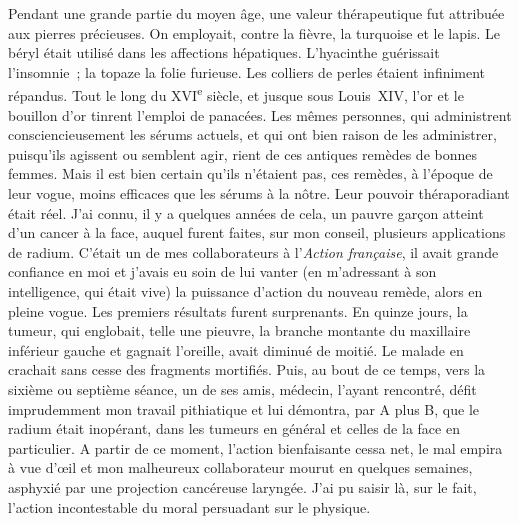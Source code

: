 \documentclass[french,twoside]{book} %
\begin{document}
Pendant une grande partie du moyen âge, une valeur thérapeutique fut attribuée aux pierres précieuses. On employait, contre la fièvre, la turquoise et le lapis. Le béryl était utilisé dans les affections hépatiques. L’hyacinthe guérissait l’insomnie ; la topaze la folie furieuse. Les colliers de perles étaient infiniment répandus. Tout le long du XVI\textsuperscript{e} siècle, et jusque sous Louis XIV, l’or et le bouillon d’or tinrent l’emploi de panacées. Les mêmes personnes, qui administrent consciencieusement les sérums actuels, et qui ont bien raison de les administrer, puisqu’ils agissent ou semblent agir, rient de ces antiques remèdes de bonnes femmes. Mais il est bien certain qu’ils n’étaient pas, ces remèdes, à l’époque de leur vogue, moins efficaces que les sérums à la nôtre. Leur pouvoir théraporadiant était réel. J’ai connu, il y a quelques années de cela, un pauvre garçon atteint d’un cancer à la face, auquel furent faites, sur mon conseil, plusieurs applications de radium. C’était un de mes collaborateurs à l’{\itshape Action française}, il avait grande confiance en moi et j’avais eu soin de lui vanter (en m’adressant à son intelligence, qui était vive) la puissance d’action du nouveau remède, alors en pleine vogue. Les premiers résultats furent surprenants. En quinze jours, la tumeur, qui englobait, telle une pieuvre, la branche montante du maxillaire inférieur gauche et gagnait l’oreille, avait diminué de moitié. Le malade en crachait sans cesse des fragments mortifiés. Puis, au bout de ce temps, vers la sixième ou septième séance, un de ses amis, médecin, l’ayant rencontré, défit imprudemment mon travail pithiatique et lui démontra, par A plus B, que le radium était inopérant, dans les tumeurs en général et celles de la face en particulier. A partir de ce moment, l’action bienfaisante cessa net, le mal empira à vue d’œil et mon malheureux collaborateur mourut en quelques semaines, asphyxié par une projection cancéreuse laryngée. J’ai pu saisir là, sur le fait, l’action incontestable du moral persuadant sur le physique.\par
\end{document}
